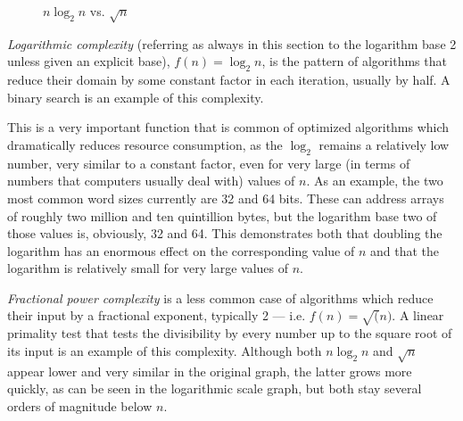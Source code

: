 \begin{figure}[ht]
    \centering
    \caption{$n \log_{2}n$ vs. $\sqrt{n}$}
    \label{fig:algo:comp_nlog_sqrt_n}
\end{figure}

\textit{Logarithmic complexity} (referring as always in this section to the
logarithm base 2 unless given an explicit base), $f(n) = \log_{2}n$, is the
pattern of algorithms that reduce their domain by some constant factor in each
iteration, usually by half.  A binary search is an example of this complexity.

This is a very important function that is common of optimized algorithms which
dramatically reduces resource consumption, as the $\log_{2}$ remains a
relatively low number, very similar to a constant factor, even for very large
(in terms of numbers that computers usually deal with) values of $n$.  As an
example, the two most common word sizes currently are 32 and 64 bits.  These can
address arrays of roughly two million and ten quintillion bytes, but the
logarithm base two of those values is, obviously, 32 and 64.  This demonstrates
both that doubling the logarithm has an enormous effect on the corresponding
value of $n$ and that the logarithm is relatively small for very large values of
$n$.

\textit{Fractional power complexity} is a less common case of algorithms which
reduce their input by a fractional exponent, typically 2 --- i.e. $f(n) =
\sqrt(n)$.  A linear primality test that tests the divisibility by every number
up to the square root of its input is an example of this complexity.  Although
both $n \log_{2}n$ and $\sqrt{n}$ appear lower and very similar in the original
graph, the latter grows more quickly, as can be seen in the logarithmic scale
graph, but both stay several orders of magnitude below $n$.

